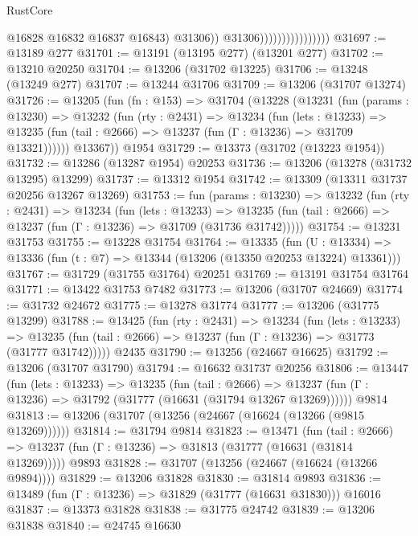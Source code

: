 \begin{lexlean}{RustCore}
\begin{coremodule}
                                          @16828
                                          @16832
                                          @16837
                                          @16843)
                                        @31306))
                                    @31306))))))))))))))))
@31697 := @13189 @277
@31701 := @13191 (@13195 @277) (@13201 @277)
@31702 := @13210 @20250
@31704 := @13206 (@31702 @13225)
@31706 := @13248 (@13249 @277)
@31707 := @13244 @31706
@31709 := @13206 (@31707 @13274)
@31726 := @13205
    (fun (fn : @153) =>
    @31704
      (@13228
        (@13231
          (fun (params : @13230) =>
          @13232
            (fun (rty : @2431) =>
            @13234
              (fun (lets : @13233) =>
              @13235 (fun (tail : @2666) => @13237 (fun (Γ : @13236) => @31709 @13321))))))
        @13367))
    @1954
@31729 := @13373 (@31702 (@13223 @1954))
@31732 := @13286 (@13287 @1954) @20253
@31736 := @13206 (@13278 (@31732 @13295) @13299)
@31737 := @13312 @1954
@31742 := @13309 (@13311 @31737 @20256 @13267 @13269)
@31753 := fun (params : @13230) =>
  @13232
    (fun (rty : @2431) =>
    @13234
      (fun (lets : @13233) =>
      @13235 (fun (tail : @2666) => @13237 (fun (Γ : @13236) => @31709 (@31736 @31742)))))
@31754 := @13231 @31753
@31755 := @13228 @31754
@31764 := @13335
    (fun (U : @13334) => @13336 (fun (t : @7) => @13344 (@13206 (@13350 @20253 @13224) @13361)))
@31767 := @31729 (@31755 @31764) @20251
@31769 := @13191 @31754 @31764
@31771 := @13422 @31753 @7482
@31773 := @13206 (@31707 @24669)
@31774 := @31732 @24672
@31775 := @13278 @31774
@31777 := @13206 (@31775 @13299)
@31788 := @13425
    (fun (rty : @2431) =>
    @13234
      (fun (lets : @13233) =>
      @13235 (fun (tail : @2666) => @13237 (fun (Γ : @13236) => @31773 (@31777 @31742)))))
    @2435
@31790 := @13256 (@24667 @16625)
@31792 := @13206 (@31707 @31790)
@31794 := @16632 @31737 @20256
@31806 := @13447
    (fun (lets : @13233) =>
    @13235
      (fun (tail : @2666) =>
      @13237 (fun (Γ : @13236) => @31792 (@31777 (@16631 (@31794 @13267 @13269))))))
    @9814
@31813 := @13206 (@31707 (@13256 (@24667 (@16624 (@13266 (@9815 @13269))))))
@31814 := @31794 @9814
@31823 := @13471
    (fun (tail : @2666) => @13237 (fun (Γ : @13236) => @31813 (@31777 (@16631 (@31814 @13269)))))
    @9893
@31828 := @31707 (@13256 (@24667 (@16624 (@13266 @9894))))
@31829 := @13206 @31828
@31830 := @31814 @9893
@31836 := @13489 (fun (Γ : @13236) => @31829 (@31777 (@16631 @31830))) @16016
@31837 := @13373 @31828
@31838 := @31775 @24742
@31839 := @13206 @31838
@31840 := @24745 @16630

\end{coremodule}
\end{lexlean}
